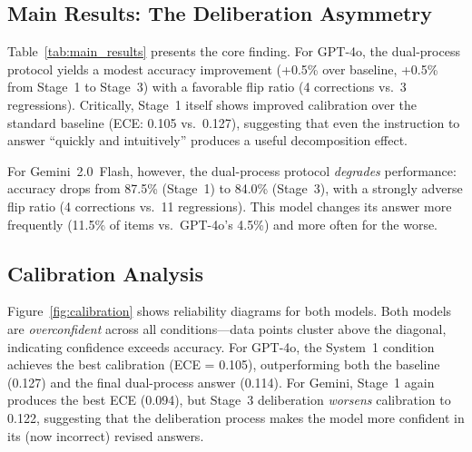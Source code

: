 \documentclass{cvpr}
\begin{document}
\subsection{Main Results: The Deliberation Asymmetry}

Table~\ref{tab:main_results} presents the core finding. For GPT-4o, the dual-process protocol yields a modest accuracy improvement (+0.5\% over baseline, +0.5\% from Stage~1 to Stage~3) with a favorable flip ratio (4 corrections vs.\ 3 regressions). Critically, Stage~1 itself shows improved calibration over the standard baseline (ECE: 0.105 vs.\ 0.127), suggesting that even the instruction to answer ``quickly and intuitively'' produces a useful decomposition effect.

For Gemini~2.0~Flash, however, the dual-process protocol \emph{degrades} performance: accuracy drops from 87.5\% (Stage~1) to 84.0\% (Stage~3), with a strongly adverse flip ratio (4 corrections vs.\ 11 regressions). This model changes its answer more frequently (11.5\% of items vs.\ GPT-4o's 4.5\%) and more often for the worse.

\begin{table}[t]
\centering
\caption{\textbf{Main results.} Accuracy, ECE, and answer transitions. \emph{Flip$\rightarrow$C} = corrected after deliberation; \emph{Flip$\rightarrow$W} = changed to wrong. Net = Flip$\rightarrow$C minus Flip$\rightarrow$W.}
\label{tab:main_results}
\end{table}

\subsection{Calibration Analysis}

Figure~\ref{fig:calibration} shows reliability diagrams for both models. Both models are \emph{overconfident} across all conditions---data points cluster above the diagonal, indicating confidence exceeds accuracy. For GPT-4o, the System~1 condition achieves the best calibration (ECE = 0.105), outperforming both the baseline (0.127) and the final dual-process answer (0.114). For Gemini, Stage~1 again produces the best ECE (0.094), but Stage~3 deliberation \emph{worsens} calibration to 0.122, suggesting that the deliberation process makes the model more confident in its (now incorrect) revised answers.
\end{document}
